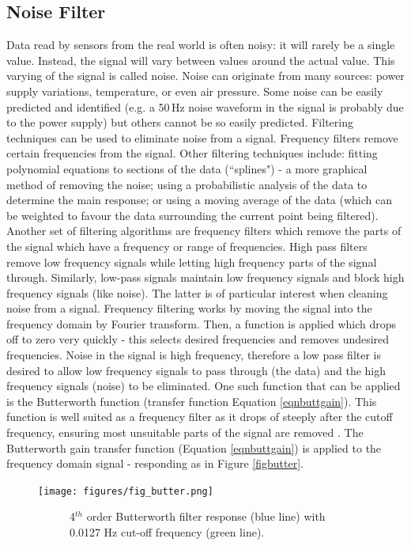 \documentclass[twoside,a4]{report}
\def\br{\newline \newline \noindent}
\begin{document}
	\subsection*{Noise Filter}
	Data read by sensors from the real world is often noisy: it will rarely be a single value. Instead, the signal will vary between values around the actual value. This varying of the signal is called noise. Noise can originate from many sources: power supply variations, temperature, or even air pressure. Some noise can be easily predicted and identified (e.g. a 50\,Hz noise waveform in the signal is probably due to the power supply) but others cannot be so easily predicted. 
	\br
	Filtering techniques can be used to eliminate noise from a signal. Frequency filters remove certain frequencies from the signal. Other filtering techniques include: fitting polynomial equations to sections of the data (``splines") - a more graphical method of removing the noise; using a probabilistic analysis of the data to determine the main response; or using a moving average of the data (which can be weighted to favour the data surrounding the current point being filtered).
	\br
	Another set of filtering algorithms are frequency filters which remove the parts of the signal which have a frequency or range of frequencies. High pass filters remove low frequency signals while letting high frequency parts of the signal through. Similarly, low-pass signals maintain low frequency signals and block high frequency signals (like noise). The latter is of particular interest when cleaning noise from a signal. Frequency filtering works by moving the signal into the frequency domain by Fourier transform. Then, a function is applied which drops off to zero very quickly - this selects desired frequencies and removes undesired frequencies. Noise in the signal is high frequency, therefore a low pass filter is desired to allow low frequency signals to pass through (the data) and the high frequency signals (noise) to be eliminated. One such function that can be applied is the Butterworth function (transfer function Equation \ref{eqnbuttgain}). This function is well suited as a frequency filter as it drops of steeply after the cutoff frequency, ensuring most unsuitable parts of the signal are removed \cite{backsignalbutter}. The Butterworth gain transfer function (Equation \ref{eqnbuttgain}) is applied to the frequency domain signal - responding as in Figure \ref{figbutter}.
	
	\begin{figure}[!htb]
		\centering
		\texttt{[image: figures/fig\_butter.png]}
		\caption{Frequency Domain Signal Response To Butterworth Function}
		\label{figbutter}
		\begin{subfigure}{0.8\textwidth}
			\centering
			{\footnotesize 4$^{th}$ order Butterworth filter response (blue line) with 0.0127 Hz cut-off frequency (green line).}
		\end{subfigure}
	\end{figure}
	
\end{document}
